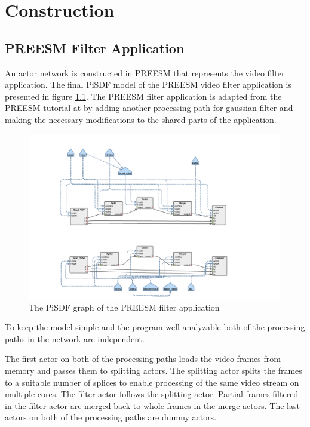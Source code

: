 \chapter{Construction}
\label{chapter:construction}
\section{PREESM Filter Application}
\label{sec:preesmapp}
An actor network is constructed in PREESM that represents the video filter
application. The final PiSDF model of the PREESM video filter application is
presented in figure \ref{preesm_actors}. The PREESM filter application is
adapted from the PREESM tutorial at \cite{preesmtut} by adding another
processing path for gaussian filter and making the necessary modifications to
the shared parts of the application.

\begin{figure}[h!] \label{preesm_actors} \begin{center}
    \includegraphics[width=0.99\textwidth]{images/preesm_diagram.png}
    \caption{The PiSDF graph of the PREESM filter application} \end{center}
\end{figure}

To keep the model simple and the program well analyzable both of the processing
paths in the network are independent.

The first actor on both of the processing paths loads the video frames from
memory and passes them to splitting actors. The splitting actor splits the
frames to a suitable number of splices to enable processing of the same video
stream on multiple cores. The filter actor follows the splitting actor. Partial
frames filtered in the filter actor are merged back to whole frames in the merge
actors. The last actors on both of the processing paths are dummy actors.\\

